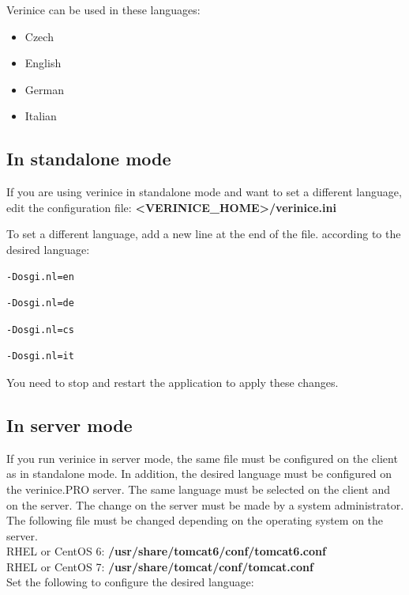 \documentclass[a4paper,10pt]{book}
\begin{document}
Verinice can be used in these languages:
\begin{itemize}
 \item Czech
 \item English
 \item German
 \item Italian
\end{itemize}

\subsection{In standalone mode}
If you are using verinice in standalone mode and want to set a different language, edit the configuration file:
\newline 
\textbf{\textless VERINICE\_HOME\textgreater/verinice.ini}

To set a different language, add a new line at the end of the file.
according to the desired language:

\begin{lstlisting}[language=Plain, caption={verinice.ini English}]
-Dosgi.nl=en
\end{lstlisting}

\begin{lstlisting}[language=Plain, caption={verinice.ini German}]
-Dosgi.nl=de
\end{lstlisting}

\begin{lstlisting}[language=Plain, caption={verinice.ini Czech}]
-Dosgi.nl=cs
\end{lstlisting}

\begin{lstlisting}[language=Plain, caption={verinice.ini Italian}]
-Dosgi.nl=it
\end{lstlisting}

You need to stop and restart the application to apply these changes.

\subsection{In server mode}

If you run verinice in server mode, the same file must be configured on the client as in standalone mode. In addition, the desired language must be configured on the verinice.\textsc{PRO} server. The same language must be selected on the client and on the server. The change on the server must be made by a system administrator. The following file must be changed depending on the operating system on the server.\newline\\ 
RHEL or CentOS 6:
\textbf{/usr/share/tomcat6/conf/tomcat6.conf} \newline\\
RHEL or CentOS 7:
\textbf{/usr/share/tomcat/conf/tomcat.conf} 
\newline\\
Set the following to configure the desired language:
\end{document}
